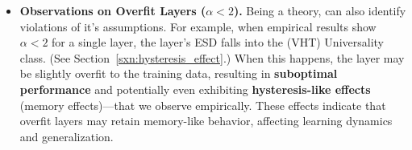 \begin{itemize}
   \item 
   \textbf{Observations on Overfit Layers ($\alpha < 2$).} 
   Being a \SemiEmpirical theory, \SETOL can also identify violations of it's assumptions.
   For example, when empirical results show $\alpha < 2$ for a single layer, the layer's ESD falls into the \HTSR \VeryHeavyTailed (VHT) Universality class.
   (See Section~\ref{sxn:hysteresis_effect}.)
   When this happens, the layer may be slightly overfit to the training data, resulting in \textbf{suboptimal performance} and potentially even exhibiting \textbf{hysteresis-like effects} (memory effects)---that we observe empirically.
   These effects indicate that overfit layers may retain memory-like behavior, affecting learning dynamics and generalization.
\end{itemize}


